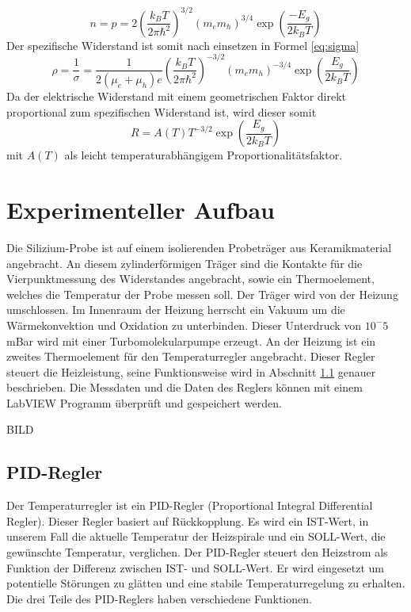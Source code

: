 \documentclass[a4paper,parskip,11pt, DIV12]{scrreprt}
\begin{document}
\begin{equation}
n = p = 2 \left(\frac{k_B T}{2 \pi \hbar^2}\right)^{3/2} (m_e m_h)^{3/4} \exp \left(\frac{-E_g}{2 k_B T}\right)
\end{equation}
Der spezifische Widerstand ist somit nach einsetzen in Formel \ref{eq:sigma}
\begin{equation}
\rho = \frac{1}{\sigma} = \frac{1}{2 (\mu_e + \mu_h)e} \left(\frac{k_B T}{2 \pi \hbar^2}\right)^{-3/2} (m_e m_h)^{-3/4} \exp \left(\frac{E_g}{2 k_B T}\right)
\end{equation}
Da der elektrische Widerstand mit einem geometrischen Faktor direkt proportional zum spezifischen Widerstand ist, wird dieser somit
\begin{equation}
\label{eq:Endloesung}
R = A(T) T^{-3/2} \exp \left(\frac{E_g}{2 k_B T}\right)
\end{equation}
mit $A(T)$ als leicht temperaturabhängigem Proportionalitätsfaktor. 

\section{Experimenteller Aufbau}
Die Silizium-Probe ist auf einem isolierenden Probeträger aus Keramikmaterial angebracht. An diesem zylinderförmigen Träger sind die Kontakte für die Vierpunktmessung des Widerstandes angebracht, sowie ein Thermoelement, welches die Temperatur der Probe messen soll. Der Träger wird von der Heizung umschlossen. Im Innenraum der Heizung herrscht ein Vakuum um die Wärmekonvektion und Oxidation zu unterbinden. Dieser Unterdruck von $10^-5$ mBar wird mit einer Turbomolekularpumpe erzeugt. An der Heizung ist ein zweites Thermoelement für den Temperaturregler angebracht. Dieser Regler steuert die Heizleistung, seine Funktionsweise wird in Abschnitt \ref{PID_Regler}  genauer beschrieben. Die Messdaten und die Daten des Reglers können mit einem LabVIEW Programm überprüft und gespeichert werden.

BILD


\subsection{PID-Regler}
\label{PID_Regler}
Der Temperaturregler ist ein PID-Regler (Proportional Integral Differential Regler). Dieser Regler basiert auf Rückkopplung. Es wird ein IST-Wert, in unserem Fall die aktuelle Temperatur der Heizspirale und ein SOLL-Wert, die gewünschte Temperatur, verglichen. Der PID-Regler steuert den Heizstrom als Funktion der Differenz zwischen IST- und SOLL-Wert. Er wird eingesetzt um potentielle Störungen zu glätten und eine stabile Temperaturregelung zu erhalten. Die drei Teile des PID-Reglers haben verschiedene Funktionen.
\end{document}
